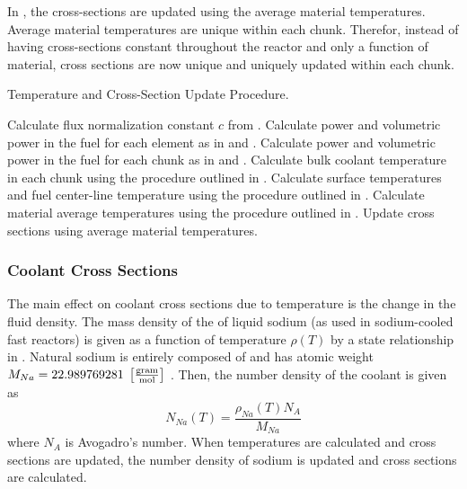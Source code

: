     In , the cross-sections are
    updated using the average material temperatures. Average material
    temperatures are unique within each chunk. Therefor, instead of having
    cross-sections constant throughout the reactor and only a function of
    material, cross sections are now unique and uniquely updated within each
    chunk.

    \begin{algorithm}
      \caption{Temperature and Cross-Section Update Procedure.}
      \label{algorithm:temperature_update}
      \begin{algorithmic}[1]
        \State Calculate flux normalization constant $c$ from
          .
        \State Calculate power and volumetric power in the fuel for each element
          as in  and .
        \State Calculate power and volumetric power in the fuel for each chunk
          as in  and .
        \State Calculate bulk coolant temperature in each chunk using the 
          procedure outlined in .
        \State Calculate surface temperatures and fuel center-line temperature
          using the procedure outlined in .
        \State Calculate material average temperatures using the procedure 
          outlined in .
        \State Update cross sections using average material temperatures.
      \end{algorithmic}
    \end{algorithm}

    \subsubsection{Coolant Cross Sections}
      The main effect on coolant cross sections due to temperature is the change
      in the fluid density. The mass density of the of liquid sodium (as used in
      sodium-cooled fast reactors) is given as a function of temperature
      $\rho(T)$ by a state relationship in \cite{sodiumProp}. Natural sodium is
      entirely composed of  and has atomic weight $M_{Na} =
      22.989769281 \;\left[\text{{$\frac{\text{gram}}{\text{mol}}$}}\right]$ \cite{nuclides}.
      Then, the number density of the coolant is given as
      \begin{equation}
        \label{eq:number_density_sodium}
        N_{Na}(T) = \frac{\rho_{Na}(T) N_A}{M_{Na}}
      \end{equation}
      where $N_A$ is Avogadro's number. When temperatures are calculated and
      cross sections are updated, the number density of sodium is updated and
      cross sections are calculated. 
      
